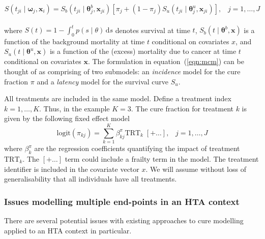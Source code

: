 \documentclass[AMA,STIX1COL]{WileyNJD-v2}
\begin{document}
\begin{equation}
\label{eqn:mcm}
S(t_{ji} \mid \bm\omega_j, \bm{x}_i) = S_b(t_{ji} \mid \bm\theta^b_j, \bm{x}_{ji}) \left[\pi_j + (1 - \pi_j) S_u(t_{ji} \mid \bm\theta^u_j, \bm{x}_{ji}) \right], \;\;\; j = 1, \ldots, J
\end{equation}
\\
\noindent
where $S(t) = 1 \!-\! \int_0^t p(s \mid \theta)\, \text{d}s$ denotes survival at time $t$,
$S_b(t \mid \bm\theta^b, \bm{x})$ is a function of the background mortality at time $t$ conditional on covariates $x$,
and $S_u(t \mid \bm\theta^u, \bm{x})$ is a function of the (excess) mortality due to cancer at time $t$ conditional on covariates $\bm{x}$.
The formulation in equation~(\ref{eqn:mcm}) can be thought of as comprising of two submodels: an \textit{incidence} model for the cure fraction $\pi$ and a \textit{latency} model for the survival curve $S_u$. 

All treatments are included in the same model. Define a treatment index $k = 1, \ldots, K$.
Thus, in the example $K=3$.
The cure fraction for treatment $k$ is given by the following fixed effect model
\begin{equation}
\label{eqn:pi_regn}
\mbox{logit}(\pi_{kj}) = \sum_{k=1}^K \beta^{\pi}_{kj} \mbox{TRT}_k \;[+ \ldots], \;\;\; j = 1, \ldots, J
\end{equation}
\noindent
where $\beta^{\pi}_k$ are the regression coefficients quantifying the impact of treatment $\mbox{TRT}_k$.
The $[+ \ldots]$ term could include a frailty term in the model.
The treatment identifier is included in the covariate vector $x$.
We will assume without loss of generalisability that all individuals have all treatments.


\subsubsection{Issues modelling multiple end-points in an HTA context}
There are several potential issues with existing approaches to cure modelling applied to an HTA context in particular.
\end{document}
